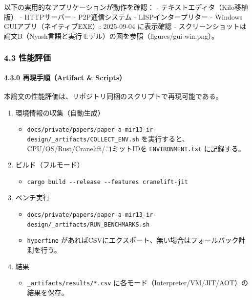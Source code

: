 \documentclass[
]{article}
\providecommand{\tightlist}{%
  \setlength{\itemsep}{0pt}\setlength{\parskip}{0pt}}
\begin{document}
以下の実用的なアプリケーションが動作を確認： -
テキストエディタ（Kilo移植版） - HTTPサーバー - P2P通信システム -
LISPインタープリター - Windows GUIアプリ（ネイティブEXE）: 2025-09-04
に表示確認 -
スクリーンショットは論文B（Nyash言語と実行モデル）の図を参照（figures/gui-win.png）。

\hypertarget{ux6027ux80fdux8a55ux4fa1}{%
\subsubsection{4.3 性能評価}\label{ux6027ux80fdux8a55ux4fa1}}

\hypertarget{ux518dux73feux624bux9806artifact-scripts}{%
\paragraph{4.3.0 再現手順（Artifact \&
Scripts）}\label{ux518dux73feux624bux9806artifact-scripts}}

本論文の性能評価は、リポジトリ同梱のスクリプトで再現可能である。

\begin{enumerate}
\def\labelenumi{\arabic{enumi}.}
\tightlist
\item
  環境情報の収集（自動生成）

  \begin{itemize}
  \tightlist
  \item
    \texttt{docs/private/papers/paper-a-mir13-ir-design/\_artifacts/COLLECT\_ENV.sh}
    を実行すると、CPU/OS/Rust/Cranelift/コミットIDを
    \texttt{ENVIRONMENT.txt} に記録する。
  \end{itemize}
\item
  ビルド（フルモード）

  \begin{itemize}
  \tightlist
  \item
    \texttt{cargo\ build\ -\/-release\ -\/-features\ cranelift-jit}
  \end{itemize}
\item
  ベンチ実行

  \begin{itemize}
  \tightlist
  \item
    \texttt{docs/private/papers/paper-a-mir13-ir-design/\_artifacts/RUN\_BENCHMARKS.sh}
  \item
    \texttt{hyperfine}
    があればCSVにエクスポート、無い場合はフォールバック計測を行う。
  \end{itemize}
\item
  結果

  \begin{itemize}
  \tightlist
  \item
    \texttt{\_artifacts/results/*.csv}
    に各モード（Interpreter/VM/JIT/AOT）の結果を保存。
  \end{itemize}
\end{enumerate}
\end{document}
